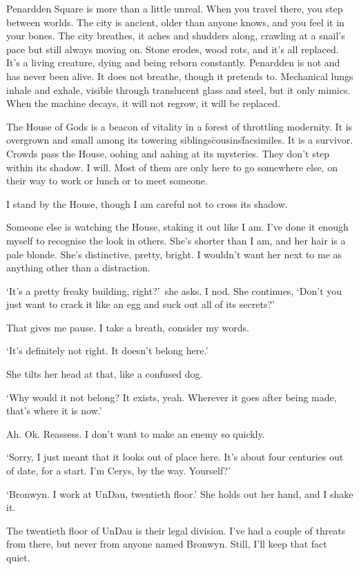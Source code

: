 Penardden Square is more than a little unreal. When you travel there,
you step between worlds. The city is ancient, older than anyone knows,
and you feel it in your bones. The city breathes, it aches and
shudders along, crawling at a snail's pace but still always moving
on. Stone erodes, wood rots, and it's all replaced. It's a living
creature, dying and being reborn constantly. Penardden is not and has
never been alive. It does not breathe, though it pretends
to. Mechanical lungs inhale and exhale, visible through translucent
glass and steel, but it only mimics. When the machine decays, it will
not regrow, it will be replaced.

The House of Gods is a beacon of vitality in a forest of throttling
modernity. It is overgrown and small among its towering siblings\=%
cousins\=facsimiles. It is a survivor.  Crowds pass the House, oohing
and aahing at its mysteries. They don't step within its shadow. I
will. Most of them are only here to go somewhere else, on their way to
work or lunch or to meet someone.

I stand by the House, though I am careful not to cross its shadow.

Someone else is watching the House, staking it out like I am. I've
done it enough myself to recognise the look in others. She's shorter
than I am, and her hair is a pale blonde. She's distinctive, pretty,
bright. I wouldn't want her next to me as anything other than a
distraction.

`It's a pretty freaky building, right?'~she asks. I nod. She
continues, `Don't you just want to crack it like an egg and suck out
all of its secrets?'

That gives me pause. I take a breath, consider my words.

`It's definitely not right. It doesn't belong here.'

She tilts her head at that, like a confused dog.

`Why would it not belong? It exists, yeah. Wherever it goes after
being made, that's where it is now.'

Ah. Ok. Reassess. I don't want to make an enemy so quickly.

`Sorry, I just meant that it looks out of place here. It's about four
centuries out of date, for a start. I'm Cerys, by the way. Yourself?'

`Bronwyn. I work at UnDau, twentieth floor.' She holds out her hand,
and I shake it.

The twentieth floor of UnDau is their legal division. I've had a
couple of threats from there, but never from anyone named Bronwyn. Still,
I'll keep that fact quiet.

